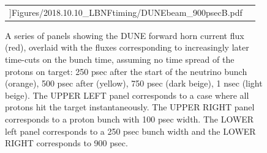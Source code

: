 \begin{figure}[t]
\begin{center}
\begin{tabular}{c c}
                  \linewidth]{Figures/2018.10.10_LBNFtiming/DUNEbeam_900psecB.pdf}
                \\
			\end{tabular}
	\end{center}
	\caption{A series of panels showing the DUNE forward horn
          current flux (red), overlaid with the fluxes corresponding
          to increasingly later time-cuts on the bunch time, assuming
          no time spread of the protons on target: 250 psec after the
          start of the neutrino bunch (orange), 500 psec after
          (yellow), 750 psec (dark beige), 1 nsec (light beige). The
          UPPER LEFT panel corresponds to a case where all protons hit
          the target instantaneously. The UPPER RIGHT panel
          corresponds to a proton bunch with 100 psec width. The LOWER
          left panel corresponds to a 250 psec bunch width and the
          LOWER RIGHT corresponds to 900 psec.}
		\label{fig:anniedetector}
\end{figure}

